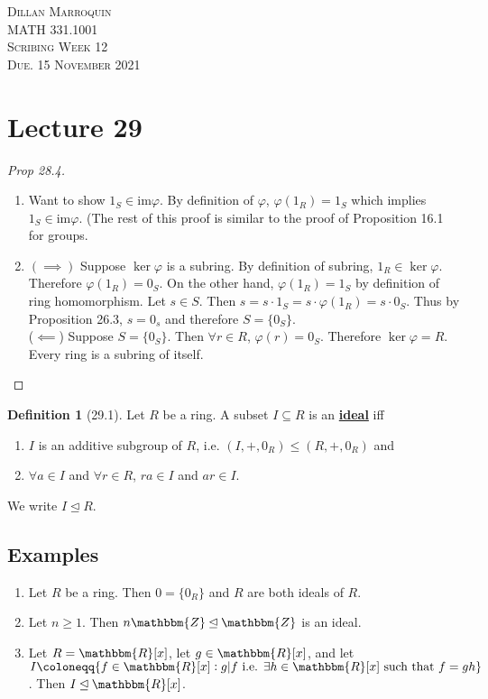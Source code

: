 \documentclass{article}
\newcommand{\Z}{\mathbbm{Z}}
\newcommand{\R}{\mathbbm{R}}
\newcommand{\coleq}{\coloneqq}
\newcommand{\define}[1]{\textbf{\underline{#1}}}
\renewcommand{\Subset}{\subseteq}
\theoremstyle{definition}
\newtheorem*{defn}{Definition}
\theoremstyle{remark}
\newcommand{\im}{\mathrm{im}}
\newcommand{\ideal}{\unlhd}
\begin{document}
    \begin{center}
        \textsc{Dillan Marroquin\\MATH 331.1001\\Scribing Week 12\\Due. 15 November 2021\\}
    \end{center}
        
    \section*{Lecture 29}{
        \begin{proof}[Prop 28.4]
            \begin{enumerate}
                \item Want to show $1_S \in \im\varphi$. By definition of $\varphi$, $\varphi(1_R)=1_S$ which implies $1_S \in \im\varphi$. (The rest of this proof is similar to the proof of Proposition 16.1 for groups.
                \item $(\implies)$ Suppose $\ker\varphi$ is a subring. By definition of subring, $1_R \in \ker \varphi$. Therefore $\varphi(1_R)=0_S$. On the other hand, $\varphi(1_R)=1_S$ by definition of ring homomorphism. Let $s \in S$. Then $s=s\cdot1_S=s\cdot\varphi(1_R)=s\cdot0_S$. Thus by Proposition 26.3, $s=0_s$ and therefore $S=\{0_S\}$.\\
                ($\impliedby$) Suppose $S=\{0_S\}$. Then $\forall r \in R$, $\varphi(r)=0_S$. Therefore $\ker\varphi=R$. Every ring is a subring of itself.
            \end{enumerate}
        \end{proof}
        
        \begin{defn}[29.1]
            Let $R$ be a ring. A subset $I \Subset R$ is an \define{ideal} iff
            \begin{enumerate}
                \item $I$ is an additive subgroup of $R$, i.e. $(I,+,0_R)\leq (R,+,0_R)$ and
                \item $\forall a \in I$ and $\forall r \in R$, $ra\in I$ and $ar \in I$.
            \end{enumerate}
            We write $I \ideal R$.
        \end{defn}
        
        \subsection*{Examples}{
            \begin{enumerate}
                \item Let $R$ be a ring. Then $0=\{0_R\}$ and $R$ are both ideals of $R$.
                \item Let $n\geq 1$. Then $n\Z \ideal \Z$ is an ideal.
                \item Let $R=\R[x]$, let $g \in \R[x]$, and let $I \coleq \{f\in \R[x]:g|f\text{ i.e. }\exists h \in \R[x]\text{ such that }f=gh\}$. Then $I \ideal \R[x]$.
            \end{enumerate}
        }
    }
\end{document}
